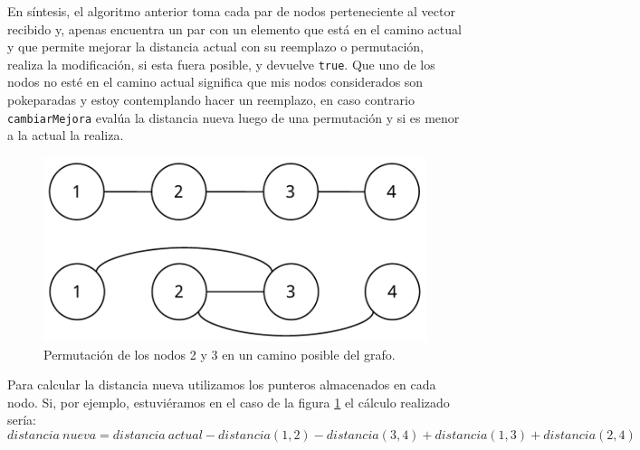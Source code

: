 En s\'intesis, el algoritmo anterior toma cada par de nodos perteneciente al vector recibido y, apenas encuentra un par con un elemento que est\'a en el camino actual y que permite mejorar la distancia actual con su reemplazo o permutaci\'on, realiza la modificaci\'on, si esta fuera posible, y devuelve \texttt{true}. Que uno de los nodos no est\'e en el camino actual significa que mis nodos considerados son pokeparadas y estoy contemplando hacer un reemplazo, en caso contrario \texttt{cambiarMejora} eval\'ua la distancia nueva luego de una permutaci\'on y si es menor a la actual la realiza.

\begin{figure}[H]
  \begin{center}
    \includegraphics[scale = 0.5]{imagenes/ej3_algoritmo_1.pdf}
    \caption{Permutaci\'on de los nodos 2 y 3 en un camino posible del grafo.}
    \label{fig:ej3_algoritmo_1}
  \end{center}
\end{figure}

Para calcular la distancia nueva utilizamos los punteros almacenados en cada nodo. Si, por ejemplo, estuvi\'eramos en el caso de la figura \ref{fig:ej3_algoritmo_1} el c\'alculo realizado ser\'ia:
\begin{equation*}
distancia\ nueva = distancia\ actual - distancia(1,2) - distancia(3,4) + distancia(1,3) + distancia(2,4)
\end{equation*}

